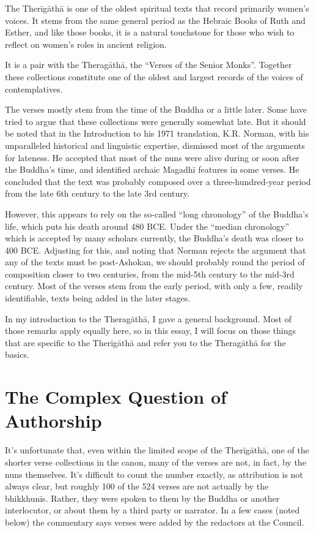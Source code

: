 \documentclass[12pt,openany]{book}%
\begin{document}
The \textsanskrit{Therīgāthā} is one of the oldest spiritual texts that record primarily women’s voices. It stems from the same general period as the Hebraic Books of Ruth and Esther, and like those books, it is a natural touchstone for those who wish to reflect on women’s roles in ancient religion.

It is a pair with the \textsanskrit{Theragāthā}, the “Verses of the Senior Monks”. Together these collections constitute one of the oldest and largest records of the voices of contemplatives.

The verses mostly stem from the time of the Buddha or a little later. Some have tried to argue that these collections were generally somewhat late. But it should be noted that in the Introduction to his 1971 translation, K.R. Norman, with his unparalleled historical and linguistic expertise, dismissed most of the arguments for lateness. He accepted that most of the nuns were alive during or soon after the Buddha’s time, and identified archaic \textsanskrit{Magadhī} features in some verses. He concluded that the text was probably composed over a three-hundred-year period from the late 6th century to the late 3rd century.

However, this appears to rely on the so-called “long chronology” of the Buddha’s life, which puts his death around 480 BCE. Under the “median chronology” which is accepted by many scholars currently, the Buddha’s death was closer to 400 BCE. Adjusting for this, and noting that Norman rejects the argument that any of the texts must be post-Ashokan, we should probably round the period of composition closer to two centuries, from the mid-5th century to the mid-3rd century. Most of the verses stem from the early period, with only a few, readily identifiable, texts being added in the later stages.

In my introduction to the \textsanskrit{Theragāthā}, I gave a general background. Most of those remarks apply equally here, so in this essay, I will focus on those things that are specific to the \textsanskrit{Therīgāthā} and refer you to the \textsanskrit{Theragāthā} for the basics.

\section*{The Complex Question of Authorship}

It’s unfortunate that, even within the limited scope of the \textsanskrit{Therīgāthā}, one of the shorter verse collections in the canon, many of the verses are not, in fact, by the nuns themselves. It’s difficult to count the number exactly, as attribution is not always clear, but roughly 100 of the 524 verses are not actually by the \textsanskrit{bhikkhunīs}. Rather, they were spoken to them by the Buddha or another interlocutor, or about them by a third party or narrator. In a few cases (noted below) the commentary says verses were added by the redactors at the Council.
\end{document}
